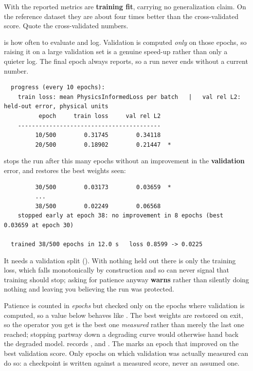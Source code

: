 \begin{pwarn}
With  the reported metrics are \textbf{training fit}, carrying no generalization claim. On the reference dataset they are about four times better than the cross-validated score. Quote the cross-validated numbers.
\end{pwarn}

\textbf{} is how often to evaluate and log. Validation is computed \emph{only} on those epochs, so raising it on a large validation set is a genuine speed-up rather than only a quieter log. The final epoch always reports, so a run never ends without a current number.

\begin{lstlisting}
  progress (every 10 epochs):
    train loss: mean PhysicsInformedLoss per batch   |   val rel L2: held-out error, physical units
          epoch     train loss     val rel L2
    -----------------------------------------
         10/500        0.31745        0.34118
         20/500        0.18902        0.21447  *
\end{lstlisting}

\textbf{} stops the run after this many epochs without an improvement in the \textbf{validation} error, and restores the best weights seen:

\begin{lstlisting}
         30/500        0.03173        0.03659  *
         ...
         38/500        0.02249        0.06568
    stopped early at epoch 38: no improvement in 8 epochs (best 0.03659 at epoch 30)

  trained 38/500 epochs in 12.0 s   loss 0.8599 -> 0.0225
\end{lstlisting}

\begin{pwarn}
It needs a validation split (). With nothing held out there is only the training loss, which falls monotonically by construction and so can never signal that training should stop; asking for patience anyway \textbf{warns} rather than silently doing nothing and leaving you believing the run was protected.
\end{pwarn}

Patience is counted in \emph{epochs} but checked only on the epochs where validation is computed, so a value below  behaves like . The best weights are restored on exit, so the operator you get is the best one \emph{measured} rather than merely the last one reached; stopping partway down a degrading curve would otherwise hand back the degraded model.  records ,  and . The \opt{*} marks an epoch that improved on the best validation score. Only epochs on which validation was actually measured can do so: a checkpoint is written against a measured score, never an assumed one.

